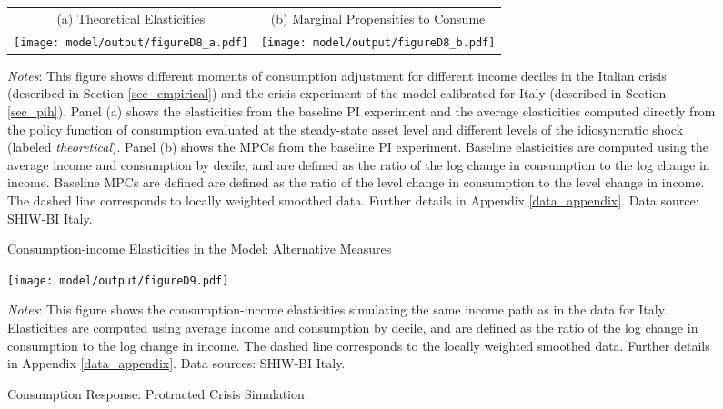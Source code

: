 \documentclass[12pt]{article}
\begin{document}
\begin{spacing}{1.5}
\begin{figure}[H]
\caption{Consumption-income Elasticities in the Model: Alternative Measures}
\label{fig:mitshock_ap}
\begin{tabular}{cc}
(a) Theoretical Elasticities & (b) Marginal Propensities to Consume \\
\texttt{[image: model/output/figureD8\_a.pdf]} &
\texttt{[image: model/output/figureD8\_b.pdf]} \\
\end{tabular}
\raggedright{}\textit{\footnotesize{}Notes}{: \footnotesize{
This figure shows different moments of consumption adjustment for different income deciles in the Italian crisis (described in Section \ref{sec_empirical}) and the crisis experiment of the model calibrated for Italy (described in Section \ref{sec_pih}). Panel (a) shows the elasticities from the baseline PI experiment and the average elasticities computed directly from the policy function of consumption evaluated at the steady-state asset level and different levels of the idiosyncratic shock (labeled \textit{theoretical}). Panel (b) shows the MPCs from the baseline PI experiment.  Baseline elasticities are computed using the average income and consumption by decile, and are defined as the ratio of the log change in consumption to the log change in income. Baseline MPCs are defined are defined as the ratio of the level change in consumption to the level change in income.  The dashed line corresponds to locally weighted smoothed data. Further details in Appendix \ref{data_appendix}.
Data source: SHIW-BI Italy.
}}{\footnotesize\par}
\end{figure}


\begin{figure}[H]
\caption{Consumption Response: Protracted Crisis Simulation}
\label{fig: protracted_shock}
\texttt{[image: model/output/figureD9.pdf]} \\
\raggedright{}\textit{\footnotesize{}Notes}{: \footnotesize{This figure shows the consumption-income elasticities simulating the same income path as in the data for Italy.
Elasticities are computed using average income and consumption by decile, and are defined as the ratio of the log change in consumption to the log change in income. The dashed line corresponds to the locally weighted smoothed data. Further details in Appendix \ref{data_appendix}.
Data sources: SHIW-BI Italy.}}{\footnotesize\par}
\end{figure}


\end{spacing}
\end{document}
